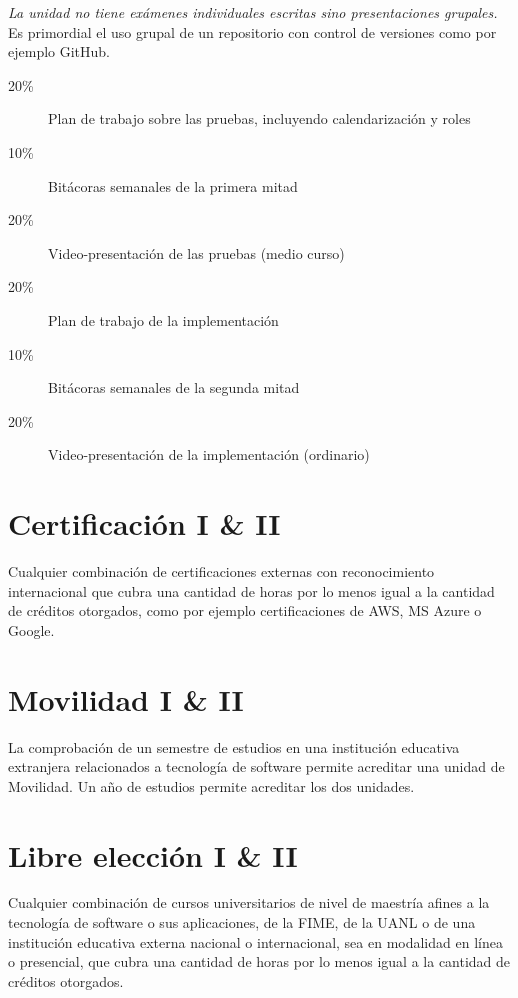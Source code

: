 \documentclass{article}
\begin{document}
\begin{multicols}{4}
{\em La unidad no tiene ex\'{a}menes individuales escritas sino
  presentaciones grupales.} Es primordial el uso grupal de un
repositorio con control de versiones como por ejemplo GitHub.

\begin{description}
\item[20\%]{Plan de trabajo sobre las pruebas, incluyendo
  calendarizaci\'{o}n y roles}
\item[10\%]{Bit\'{a}coras semanales de la primera mitad}
\item[20\%]{Video-presentaci\'{o}n de las pruebas (medio curso)}
\item[20\%]{Plan de trabajo de la implementaci\'{o}n}
\item[10\%]{Bit\'{a}coras semanales de la segunda mitad}
\item[20\%]{Video-presentaci\'{o}n de la implementaci\'{o}n (ordinario)}
\end{description}  

\end{multicols}

\newpage


\hypertarget{cert}{\section*{Certificaci\'{o}n I \& II}} 

Cualquier combinaci\'{o}n de certificaciones externas con reconocimiento
internacional que cubra una cantidad de horas por lo menos igual a la
cantidad de cr\'{e}ditos otorgados, como por ejemplo certificaciones de
AWS, MS Azure o Google.


\hypertarget{mov}{\section*{Movilidad I \& II}}

La comprobaci\'{o}n de un semestre de estudios en una instituci\'{o}n
educativa extranjera relacionados a tecnolog\'{i}a de software permite
acreditar una unidad de Movilidad. Un a\~{n}o de estudios permite
acreditar los dos unidades.

\hypertarget{le}{\section*{Libre elecci\'{o}n I \& II}} 

Cualquier combinaci\'{o}n de cursos universitarios de nivel de
maestr\'{i}a afines a la tecnolog\'{i}a de software o sus aplicaciones, de la
FIME, de la UANL o de una instituci\'{o}n educativa externa nacional o
internacional, sea en modalidad en l\'{i}nea o presencial, que cubra una
cantidad de horas por lo menos igual a la cantidad de cr\'{e}ditos
otorgados.
\end{document}
